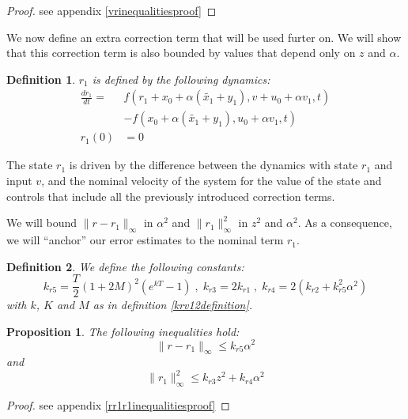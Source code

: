 \documentclass[a4paper,10pt]{article}
\newtheorem{definition}{Definition}
\newtheorem{proposition}{Proposition}
\begin{document}
\begin{proof}
    see appendix \ref{vrinequalitiesproof}
\end{proof}
We now define an extra correction term that will be used furter on. 
We will show that this correction term is also bounded by values 
that depend only on $z$ and $\alpha$.
\begin{definition}
    $r_{1}$ is defined by the following dynamics:
    \begin{equation}
		\begin{split}
        \frac{dr_{1}}{dt} =  &
	f(r_{1}+x_{0}+\alpha(\tilde{x_{1}}+y_{1}),v+u_{0}+\alpha 
	v_{1},t)\\ 
	& -  f(x_{0}+\alpha(\tilde{x_{1}}+y_{1}),u_{0}+\alpha v_{1},t)
	\\ r_{1}(0) & =0
	\end{split}
        \label{r1dynamics}
    \end{equation}
\end{definition}
The state $r_{1}$ is driven by the difference between the dynamics 
with state $r_{1}$ and input $v$, and the nominal velocity of the 
system for the value of the state and controls that include all the 
previously introduced correction terms.

We will bound $\|r-r_{1}\|_{\infty}$ in $\alpha^{2}$ and $\|r_{1}\|_{\infty}^{2}$ in $z^{2}$ and 
$\alpha^{2}$. As a consequence, we will ``anchor'' our error 
estimates to the nominal term $r_{1}$.
 \begin{definition}\label{kr345definition}
    We define the following constants:
      \[
           k_{r5} = \frac{T}{2}(1+2M)^{2}(e^{kT}-1)  \; , \;  
           k_{r3} = 2 k_{r1} \; , \; 
           k_{r4} = 2 (k_{r2} + k_{r5}^{2}\alpha^{2})
       \]
       with $k$, $K$ and $M$ as in definition \ref{krv12definition}.
 \end{definition}
\begin{proposition}\label{rr1r1inequalities}
  The following inequalities hold: 
  \begin{equation}
      \|r-r_{1}\|_{\infty} \leq k_{r5} \alpha^{2}
      \label{rr1inequality}
  \end{equation}
  and
   \begin{equation}
      \|r_{1}\|_{\infty}^{2} \leq k_{r3}z^{2} + k_{r4} \alpha^{2}
      \label{r1inequality}
  \end{equation} 
 \end{proposition}
\begin{proof}
    see appendix \ref{rr1r1inequalitiesproof}
\end{proof}
\end{document}
